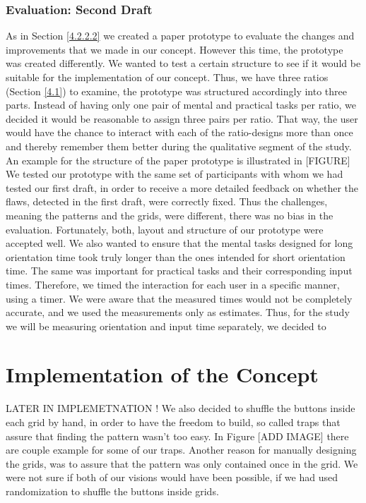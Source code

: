 \subsubsection{Evaluation: Second Draft}

As in Section \ref{4.2.2.2} we created a paper prototype to evaluate the changes and improvements that we made in our concept. However this time, the prototype was created differently. We wanted to test a certain structure to see if it would be suitable for the implementation of our concept. Thus, we have three ratios (Section \ref{4.1}) to examine, the prototype was structured accordingly into three parts. Instead of having only one pair of mental and practical tasks per ratio, we decided it would be reasonable to assign three pairs per ratio. That way, the user would have the chance to interact with each of the ratio-designs more than once and thereby remember them better during the qualitative segment of the study. An example for the structure of the paper prototype is illustrated in [FIGURE] \\

We tested our prototype with the same set of participants with whom we had tested our first draft, in order to receive a more detailed feedback on whether the flaws, detected in the first draft, were correctly fixed. Thus the challenges, meaning the patterns and the grids, were different, there was no bias in the evaluation. Fortunately, both, layout and structure of our prototype were accepted well. We also wanted to ensure that the mental tasks designed for long orientation time took truly longer than the ones intended for short orientation time. The same was important for practical tasks and their corresponding input times. Therefore, we timed the interaction for each user in a specific manner, using a timer. We were aware that the measured times would not be completely accurate, and we used the measurements only as estimates. Thus, for the study we will be measuring orientation and input time separately, we decided to 






\section{Implementation of the Concept}

LATER IN IMPLEMETNATION ! 
We also decided to shuffle the buttons inside each grid by hand, in order to have the freedom to build, so called traps that assure that finding the pattern wasn't too easy. In Figure [ADD IMAGE] there are couple example for some of our traps. Another reason for manually designing the grids, was to assure that the pattern was only contained once in the grid. We were not sure if both of our visions would have been possible, if we had used randomization to shuffle the buttons inside grids. \\



